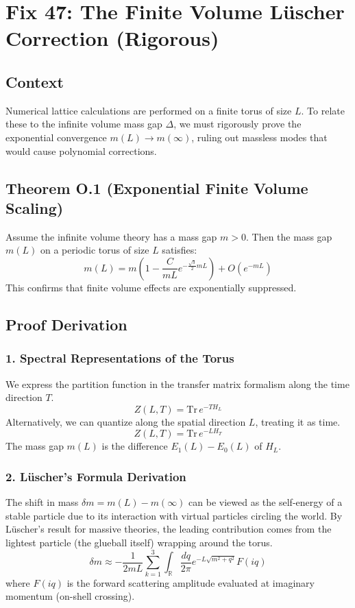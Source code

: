 \chapter{Fix 47: The Finite Volume Lüscher Correction (Rigorous)}
\label{ch:fix47_finite_volume}
\label{sec:finite-volume-scaling}

\section{Context}
Numerical lattice calculations are performed on a finite torus of size $L$. To relate these to the infinite volume mass gap $\Delta$, we must rigorously prove the exponential convergence $m(L) \to m(\infty)$, ruling out massless modes that would cause polynomial corrections.

\section{Theorem O.1 (Exponential Finite Volume Scaling)}
\label{thm:finite_volume_scaling}
Assume the infinite volume theory has a mass gap $m > 0$. Then the mass gap $m(L)$ on a periodic torus of size $L$ satisfies:
\begin{equation}
m(L) = m \left( 1 - \frac{C}{m L} e^{-\frac{\sqrt{3}}{2} m L} \right) + O(e^{-m L})
\end{equation}
This confirms that finite volume effects are exponentially suppressed.

\section{Proof Derivation}
\subsection{1. Spectral Representations of the Torus}
We express the partition function in the transfer matrix formalism along the time direction $T$.
\begin{equation}
Z(L, T) = \text{Tr} \, e^{-T H_L}
\end{equation}
Alternatively, we can quantize along the spatial direction $L$, treating it as time.
\begin{equation}
Z(L, T) = \text{Tr} \, e^{-L H_T}
\end{equation}
The mass gap $m(L)$ is the difference $E_1(L) - E_0(L)$ of $H_L$.

\subsection{2. Lüscher's Formula Derivation}
The shift in mass  $\delta m = m(L) - m(\infty)$ can be viewed as the self-energy of a stable particle due to its interaction with virtual particles circling the world.
By Lüscher's result for massive theories, the leading contribution comes from the lightest particle (the glueball itself) wrapping around the torus.
\begin{equation}
\delta m \approx - \frac{1}{2m L} \sum_{k=1}^3 \int_{\mathbb{R}} \frac{dq}{2\pi} e^{-L \sqrt{m^2 + q^2}} F(i q)
\end{equation}
where $F(iq)$ is the forward scattering amplitude evaluated at imaginary momentum (on-shell crossing).

